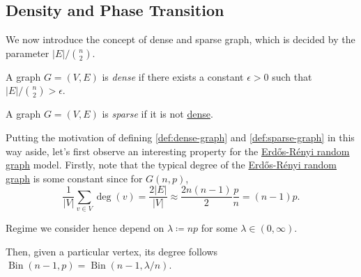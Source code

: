 \subsection{Density and Phase Transition}
We now introduce the concept of dense and sparse graph, which is decided by the parameter \(\lvert E \rvert / \binom{n}{2} \).

\begin{definition}\label{def:dense-graph}
	A graph \(G = (V, E)\) is \emph{dense} if there exists a constant \(\epsilon > 0\) such that \(\lvert E \rvert / \binom{n}{2} > \epsilon \).
\end{definition}

\begin{definition}\label{def:sparse-graph}
	A graph \(G = (V, E)\) is \emph{sparse} if it is not \hyperref[def:dense-graph]{dense}.
\end{definition}

Putting the motivation of defining \autoref{def:dense-graph} and \autoref{def:sparse-graph} in this way aside, let's first observe an interesting property for the \hyperref[def:Erdős-Rényi-random-graph]{Erdős-Rényi random graph} model. Firstly, note that the typical degree of the \hyperref[def:Erdős-Rényi-random-graph]{Erdős-Rényi random graph} is some constant since for \(G(n, p)\),
\[
	\frac{1}{\lvert V \rvert } \sum_{v \in V} \deg (v)
	= \frac{2 \lvert E \rvert }{\lvert V \rvert }
	\approx \frac{2 n (n-1)}{2} \frac{p}{n}
	= (n-1) p.
\]

\begin{note}
	Regime we consider hence depend on \(\lambda \coloneqq np\) for some \(\lambda \in (0, \infty )\).
\end{note}

Then, given a particular vertex, its degree follows \(\operatorname{Bin}(n-1, p) = \operatorname{Bin}(n-1, \lambda / n) \).

